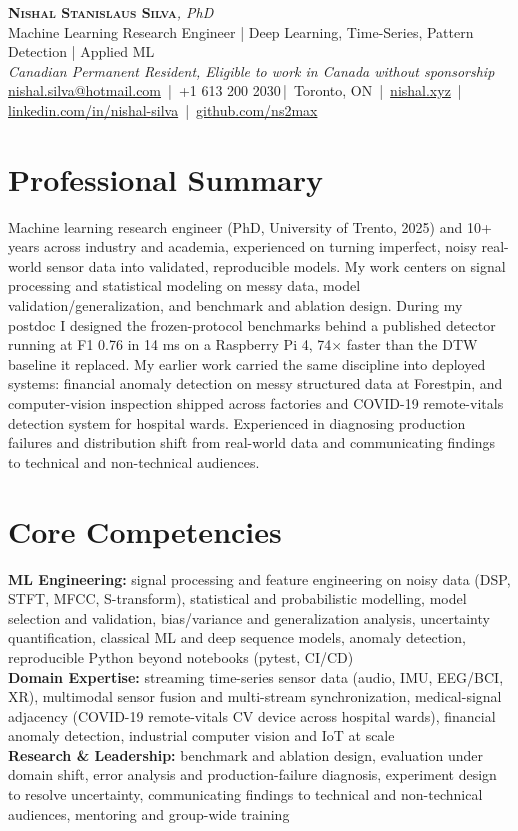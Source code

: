 \documentclass[11pt]{article}
\makeatletter
\newcommand{\cvName}{Nishal Stanislaus Silva}
\newcommand{\cvEmail}{nishal.silva@hotmail.com}
\newcommand{\cvPhone}{+1 613 200 2030}
\newcommand{\cvCity}{Toronto, ON}
\newcommand{\cvSite}{https://nishal.xyz}
\newcommand{\cvLinkedIn}{https://www.linkedin.com/in/nishal-silva}
\newcommand{\cvGitHub}{https://github.com/ns2max}
\newcommand{\cvStatus}{Canadian Permanent Resident, Eligible to work in Canada without sponsorship}
\newcommand{\cvTagline}{Machine Learning Research Engineer | Deep Learning, Time-Series, Pattern Detection | Applied ML}
\makeatother
\begin{document}
\pagestyle{empty}
\begin{center}
    {\LARGE \scshape \textbf{\cvName}}{\large \textit{, PhD}}\\[1pt]
    {\small \cvTagline}\\[1pt]
    {\footnotesize\textit{\cvStatus}}\\[1pt]
    {\small
    \href{mailto:\cvEmail}{\cvEmail} \,|\, \cvPhone \,|\, \cvCity
    \,|\, \href{\cvSite}{nishal.xyz} \,|\, \href{\cvLinkedIn}{linkedin.com/in/nishal-silva}
    \,|\, \href{\cvGitHub}{github.com/ns2max}}
\end{center}

\section*{Professional Summary}

Machine learning research engineer (PhD, University of Trento, 2025) and 10+ years across industry and academia, experienced on turning imperfect, noisy real-world sensor data into validated, reproducible models. My work centers on signal processing and statistical modeling on messy data, model validation/generalization, and benchmark and ablation design. During my postdoc I designed the frozen-protocol benchmarks behind a published detector running at F1 0.76 in 14 ms on a Raspberry Pi 4, 74$\times$ faster than the DTW baseline it replaced. My earlier work carried the same discipline into deployed systems: financial anomaly detection on messy structured data at Forestpin, and computer-vision inspection shipped across factories and COVID-19 remote-vitals detection system for hospital wards. Experienced in diagnosing production failures and distribution shift from real-world data and communicating findings to technical and non-technical audiences. 

\section*{Core Competencies}

\textbf{ML Engineering:} signal processing and feature engineering on noisy data (DSP, STFT, MFCC, S-transform), statistical and probabilistic modelling, model selection and validation, bias/variance and generalization analysis, uncertainty quantification, classical ML and deep sequence models, anomaly detection, reproducible Python beyond notebooks (pytest, CI/CD)\\
\textbf{Domain Expertise:} streaming time-series sensor data (audio, IMU, EEG/BCI, XR), multimodal sensor fusion and multi-stream synchronization, medical-signal adjacency (COVID-19 remote-vitals CV device across hospital wards), financial anomaly detection, industrial computer vision and IoT at scale\\
\textbf{Research \& Leadership:} benchmark and ablation design, evaluation under domain shift, error analysis and production-failure diagnosis, experiment design to resolve uncertainty, communicating findings to technical and non-technical audiences, mentoring and group-wide training
\end{document}
